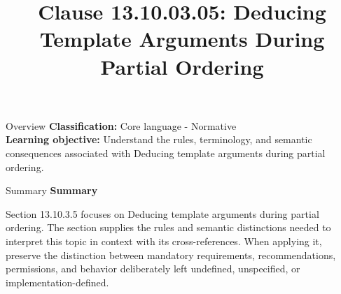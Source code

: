 \documentclass[10pt,letterpaper]{article}
\title{Clause 13.10.03.05: Deducing Template Arguments During Partial Ordering}
\author{}
\date{}
\begin{document}
\maketitle
\begin{CornellOverviewBox}{Overview}
\textbf{Classification:} Core language - Normative\\[2pt]
\textbf{Learning objective:} Understand the rules, terminology, and semantic consequences associated with Deducing template arguments during partial ordering.
\end{CornellOverviewBox}\begin{CornellSummaryBox}{Summary}
{\sffamily\bfseries\color{Accent} Summary}\par\vspace{3pt}Section 13.10.3.5 focuses on Deducing template arguments during partial ordering. The section supplies the rules and semantic distinctions needed to interpret this topic in context with its cross-references. When applying it, preserve the distinction between mandatory requirements, recommendations, permissions, and behavior deliberately left undefined, unspecified, or implementation-defined.
\end{CornellSummaryBox}
\end{document}
